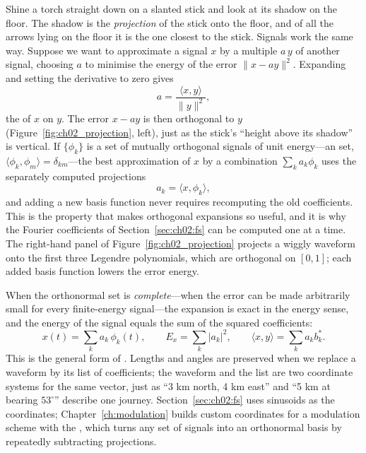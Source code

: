 Shine a torch straight down on a slanted stick and look at its shadow on the floor. The shadow is the
\emph{projection} of the stick onto the floor, and of all the arrows lying on the floor it is the one
closest to the stick. Signals work the same way. Suppose we want to approximate a signal $x$ by a
multiple $a\,y$ of another signal, choosing $a$ to minimise the energy of the error $\|x-ay\|^2$.
Expanding and setting the derivative to zero gives
\begin{equation}
a=\frac{\langle x,y\rangle}{\|y\|^2},
\label{eq:ch02:proj}
\end{equation}
the  of $x$ on $y$. The error $x-ay$ is then orthogonal to $y$
(Figure~\ref{fig:ch02_projection}, left), just as the stick's ``height above its shadow'' is vertical.
If $\{\phi_k\}$ is a set of mutually orthogonal signals of unit energy---an  set,
$\langle\phi_k,\phi_m\rangle=\delta_{km}$---the best approximation of $x$ by a combination
$\sum_k a_k\phi_k$ uses the separately computed projections
\begin{equation}
a_k=\langle x,\phi_k\rangle ,
\label{eq:ch02:coeffs}
\end{equation}
and adding a new basis function never requires recomputing the old coefficients. This is the
property that makes orthogonal expansions so useful, and it is why the Fourier coefficients of
Section~\ref{sec:ch02:fs} can be computed one at a time. The right-hand panel of
Figure~\ref{fig:ch02_projection} projects a wiggly waveform onto the first three Legendre
polynomials, which are orthogonal on $[0,1]$; each added basis function lowers the error energy.


When the orthonormal set is \emph{complete}---when the error can be made arbitrarily small for
every finite-energy signal---the expansion is exact in the energy sense, and the energy of the
signal equals the sum of the squared coefficients:
\begin{equation}
x(t)=\sum_k a_k\,\phi_k(t),\qquad E_x=\sum_k|a_k|^2 ,\qquad
\langle x,y\rangle=\sum_k a_k b_k^* .
\label{eq:ch02:parsevalgen}
\end{equation}
This is the general form of . Lengths and angles are preserved when we
replace a waveform by its list of coefficients; the waveform and the list are two coordinate systems
for the same vector, just as ``3 km north, 4 km east'' and ``5 km at bearing $53^\circ$'' describe one
journey. Section~\ref{sec:ch02:fs} uses sinusoids as the coordinates; Chapter~\ref{ch:modulation}
builds custom coordinates for a modulation scheme with the , which turns
any set of signals into an orthonormal basis by repeatedly subtracting projections.

